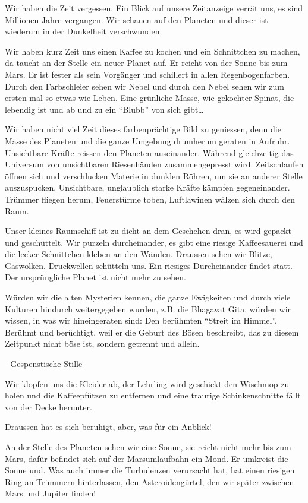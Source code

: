 \documentclass[11pt,titlepage,a5paper]{book}
\begin{document}
Wir haben die Zeit vergessen. Ein Blick auf unsere Zeitanzeige verrät uns, es sind Millionen Jahre vergangen. Wir schauen auf den Planeten und dieser ist wiederum in der Dunkelheit verschwunden.

Wir haben kurz Zeit uns einen Kaffee zu kochen und ein Schnittchen zu machen, da taucht an der Stelle ein neuer Planet auf. Er reicht von der Sonne bis zum Mars. Er ist fester als sein Vorgänger und schillert in allen Regenbogenfarben. Durch den Farbschleier sehen wir Nebel und durch den Nebel sehen wir zum ersten mal so etwas wie Leben. Eine grünliche Masse, wie gekochter Spinat, die lebendig ist und ab und zu ein "`Blubb"' von sich gibt\dots

Wir haben nicht viel Zeit dieses farbenprächtige Bild zu geniessen, denn die Masse des Planeten und die ganze Umgebung drumherum geraten in Aufruhr. Unsichtbare Kräfte reissen den Planeten auseinander. Während gleichzeitig das Universum von unsichtbaren Riesenhänden zusammengepresst wird. Zeitschlaufen öffnen sich und verschlucken Materie in dunklen Röhren, um sie an anderer Stelle auszuspucken. Unsichtbare, unglaublich starke Kräfte kämpfen gegeneinander. Trümmer fliegen herum, Feuerstürme toben, Luftlawinen wälzen sich durch den Raum.

Unser kleines Raumschiff ist zu dicht an dem Geschehen dran, es wird gepackt und geschüttelt. Wir purzeln durcheinander, es gibt eine riesige Kaffeesauerei und die lecker Schnittchen kleben an den Wänden. Draussen sehen wir Blitze, Gaswolken. Druckwellen schütteln uns. Ein riesiges Durcheinander findet statt. Der ursprüngliche Planet ist nicht mehr zu sehen.

Würden wir die alten Mysterien kennen, die ganze Ewigkeiten und durch viele Kulturen hindurch weitergegeben wurden, z.B. die Bhagavat Gita, würden wir wissen, in was wir hineingeraten sind: Den berühmten "`Streit im Himmel"'. Berühmt und berüchtigt, weil er die Geburt des Bösen beschreibt, das zu diesem Zeitpunkt nicht böse ist, sondern getrennt und allein.

- Gespenstische Stille-

Wir klopfen uns die Kleider ab, der Lehrling wird geschickt den Wischmop zu holen und die Kaffeepfützen zu entfernen und eine traurige Schinkenschnitte fällt von der Decke herunter.

Draussen hat es sich beruhigt, aber, was für ein Anblick!

An der Stelle des Planeten sehen wir eine Sonne, sie reicht nicht mehr bis zum Mars, dafür befindet sich auf der Marsumlaufbahn ein Mond. Er umkreist die Sonne und. Was auch immer die Turbulenzen verursacht hat, hat einen riesigen Ring an Trümmern hinterlassen, den Asteroidengürtel, den wir später zwischen Mars und Jupiter finden!
\end{document}
